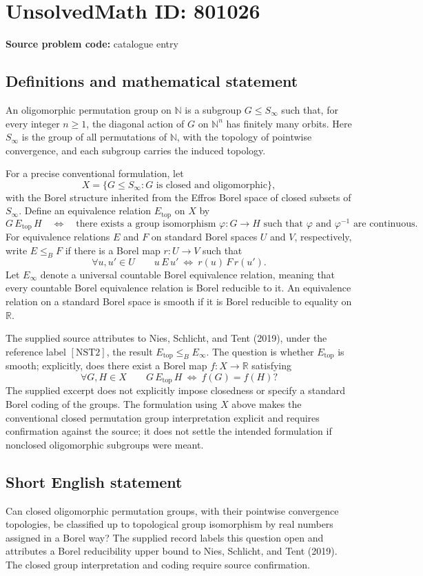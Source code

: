 \documentclass[11pt]{article}
\newcommand{\N}{\mathbb{N}}
\newcommand{\R}{\mathbb{R}}
\begin{document}
\section*{UnsolvedMath ID: 801026}
\textbf{Source problem code:} catalogue entry
\subsection{Definitions and mathematical statement}
An oligomorphic permutation group on \(\N\) is a subgroup \(G\leq S_\infty\) such that, for every integer \(n\geq 1\), the diagonal action of \(G\) on \(\N^n\) has finitely many orbits. Here \(S_\infty\) is the group of all permutations of \(\N\), with the topology of pointwise convergence, and each subgroup carries the induced topology.

For a precise conventional formulation, let
\[
X=\{G\leq S_\infty:G\text{ is closed and oligomorphic}\},
\]
with the Borel structure inherited from the Effros Borel space of closed subsets of \(S_\infty\). Define an equivalence relation \(E_{\mathrm{top}}\) on \(X\) by
\[
G\,E_{\mathrm{top}}\,H
\quad\Longleftrightarrow\quad
\text{there exists a group isomorphism }\varphi:G\to H
\text{ such that }\varphi\text{ and }\varphi^{-1}\text{ are continuous}.
\]
For equivalence relations \(E\) and \(F\) on standard Borel spaces \(U\) and \(V\), respectively, write \(E\leq_B F\) if there is a Borel map \(r:U\to V\) such that
\[
\forall u,u'\in U\qquad
u\,E\,u'\ \Longleftrightarrow\ r(u)\,F\,r(u').
\]
Let \(E_\infty\) denote a universal countable Borel equivalence relation, meaning that every countable Borel equivalence relation is Borel reducible to it. An equivalence relation on a standard Borel space is smooth if it is Borel reducible to equality on \(\R\).

The supplied source attributes to Nies, Schlicht, and Tent (2019), under the reference label \([\mathrm{NST2}]\), the result \(E_{\mathrm{top}}\leq_B E_\infty\). The question is whether \(E_{\mathrm{top}}\) is smooth; explicitly, does there exist a Borel map \(f:X\to\R\) satisfying
\[
\forall G,H\in X\qquad
G\,E_{\mathrm{top}}\,H
\ \Longleftrightarrow\ f(G)=f(H)?
\]
The supplied excerpt does not explicitly impose closedness or specify a standard Borel coding of the groups. The formulation using \(X\) above makes the conventional closed permutation group interpretation explicit and requires confirmation against the source; it does not settle the intended formulation if nonclosed oligomorphic subgroups were meant.
\subsection{Short English statement}
Can closed oligomorphic permutation groups, with their pointwise convergence topologies, be classified up to topological group isomorphism by real numbers assigned in a Borel way? The supplied record labels this question open and attributes a Borel reducibility upper bound to Nies, Schlicht, and Tent (2019). The closed group interpretation and coding require source confirmation.
\end{document}
